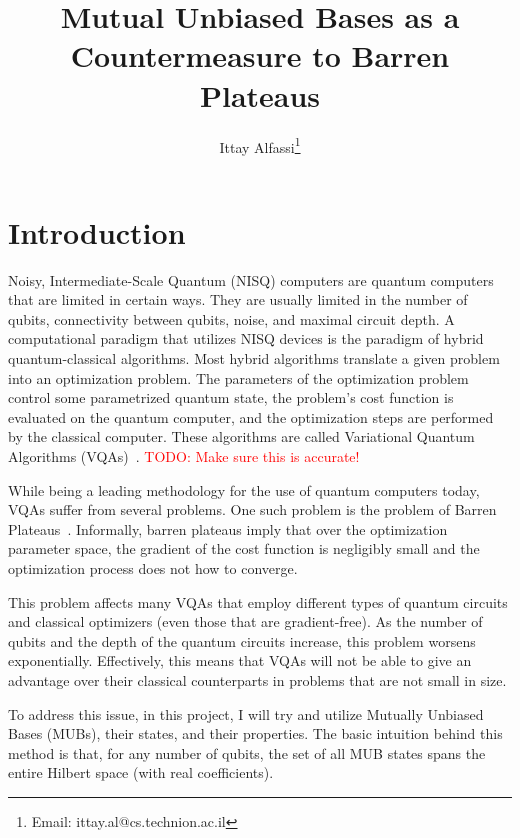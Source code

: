 \documentclass[a4paper,12pt]{article}
\title{Mutual Unbiased Bases as a Countermeasure to Barren Plateaus}
\author{Ittay Alfassi\footnote{Email: ittay.al@cs.technion.ac.il}}
\newcommand{\mytodo}[1]{\textcolor{red}{TODO: #1}}
\begin{document}
\maketitle

\thispagestyle{fancy}

\tableofcontents

\section{Introduction}
Noisy, Intermediate-Scale Quantum (NISQ) computers are quantum computers that are limited in certain ways. They are usually limited in the number of qubits, connectivity between qubits, noise, and maximal circuit depth.
A computational paradigm that utilizes NISQ devices is the paradigm of hybrid quantum-classical algorithms.
Most hybrid algorithms translate a given problem into an optimization problem.
The parameters of the optimization problem control some parametrized quantum state, the problem's cost function is evaluated on the quantum computer, and the optimization steps are performed by the classical computer. These algorithms are called Variational Quantum Algorithms (VQAs)~\cite{Cerezo2021}. \mytodo{Make sure this is accurate!}

While being a leading methodology for the use of quantum computers today, VQAs suffer from several problems. One such problem is the problem of Barren Plateaus~\cite{mcclean_barren_2018}. Informally, barren plateaus imply that over the optimization parameter space, the gradient of the cost function is negligibly small and the optimization process does not how to converge.

This problem affects many  VQAs that employ different types of quantum circuits and classical optimizers (even those that are gradient-free). As the number of qubits and the depth of the quantum circuits increase, this problem worsens exponentially.
Effectively, this means that VQAs will not be able to give an advantage over their classical counterparts in problems that are not small in size.

To address this issue, in this project, I will try and utilize Mutually Unbiased Bases (MUBs), their states, and their properties.
The basic intuition behind this method is that, for any number of qubits, the set of all MUB states spans the entire Hilbert space (with real coefficients).
\end{document}
